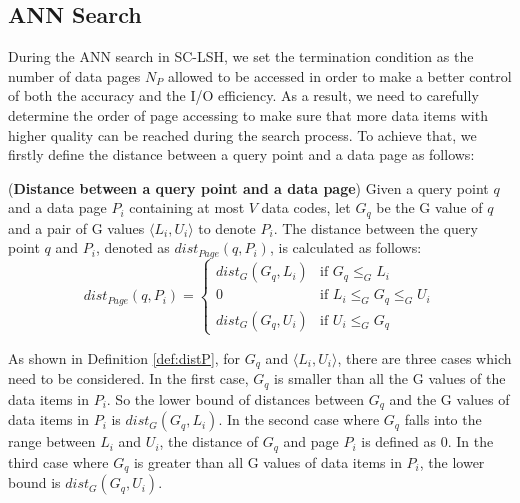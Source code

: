 \documentclass[twocolumn]{svjour3}          %
\begin{document}
\subsection{ANN Search}\label{subsec:annsearch}
During the ANN search in SC-LSH, we set the termination condition as the number of data pages $N_P$ allowed to be accessed in order to make a better control of both the accuracy and the I/O efficiency. As a result, we need to carefully determine the order of page accessing to make sure that more data items with higher quality can be reached during the search process. To achieve that, we firstly define the distance between a query point and a data page as follows:
\begin{definition}
\label{def:distP}
(\textbf{Distance between a query point and a data page}) Given a query point $q$ and a data page $P_i$ containing at most $V$ data codes, let $G_q$ be the G value of $q$ and a pair of G values $\langle L_i, U_i \rangle$ to denote $P_i$. The distance between the query point $q$ and $P_i$, denoted as $dist_{Page}(q,P_i)$, is calculated as follows:
\begin{equation}
\label{eq:distP}
dist_{Page}(q,P_i) = \left\{ \begin{array}{ll}
dist_G(G_q, L_i) & \textrm{if $G_q \leq_G L_i$} \\
0 & \textrm{if $L_i \leq_G G_q \leq_G U_i$} \\
dist_G(G_q, U_i) & \textrm{if $U_i \leq_G G_q$}
\end{array} \right.
\end{equation}
\end{definition}

As shown in Definition \ref{def:distP}, for $G_q$ and $\langle L_i,U_i\rangle$, there are three cases which need to be considered. In the first case, $G_q$ is smaller than all the G values of the data items in $P_i$. So the lower bound of distances between $G_q$ and the G values of data items in $P_i$ is $dist_G(G_q, L_i)$. In the second case where $G_q$ falls into the range between $L_i$ and $U_i$, the distance of $G_q$ and page $P_i$ is defined as 0. In the third case where $G_q$ is greater than all G values of data items in $P_i$, the lower bound is $dist_G(G_q, U_i)$.
\end{document}
